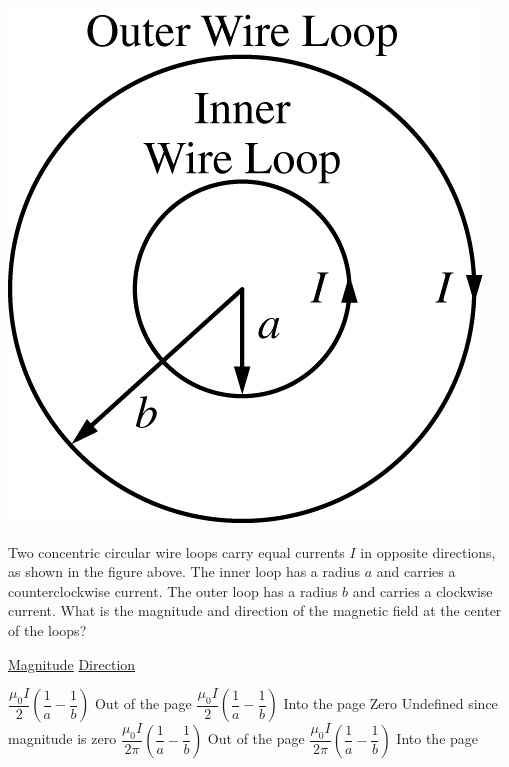 
\begin{center}
    \includegraphics[scale=0.3]{images/img-013-027.png}
\end{center}

\begin{questions}\setcounter{question}{25}\question
Two concentric circular wire loops carry equal currents $I$ in opposite directions, as shown in the figure above. The inner loop has a radius $a$ and carries a counterclockwise current. The outer loop has a radius $b$ and carries a clockwise current. What is the magnitude and direction of the magnetic field at the center of the loops?

\tabto{0.75cm}\underline{Magnitude}
\tabto{4.00cm}\underline{Direction}

\begin{choices}
    \choice $\dfrac{\mu_{0} I}{2}\left(\dfrac{1}{a}-\dfrac{1}{b}\right)$    
            \tabto{3.25cm} Out of the page
    \choice $\dfrac{\mu_{0} I}{2}\left(\dfrac{1}{a}-\dfrac{1}{b}\right)$    
            \tabto{3.25cm} Into the page
    \choice Zero                                                          
            \tabto{3.25cm} Undefined since magnitude is zero  
    \choice $\dfrac{\mu_{0} I}{2 \pi}\left(\dfrac{1}{a}-\dfrac{1}{b}\right)$
            \tabto{3.25cm}  Out of the page 
    \choice $\dfrac{\mu_{0} I}{2 \pi}\left(\dfrac{1}{a}-\dfrac{1}{b}\right)$
            \tabto{3.25cm}  Into the page 
\end{choices}
\end{questions}
